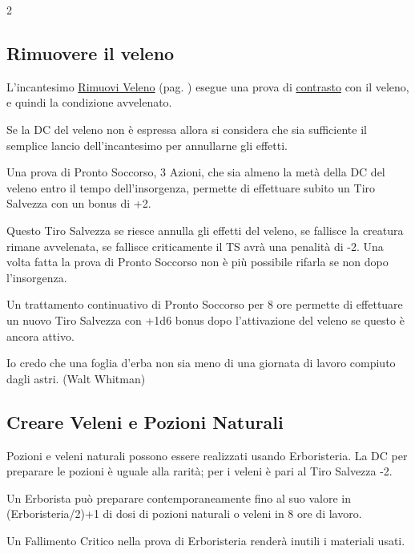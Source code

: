 \begin{multicols}{2}
\subsection{Rimuovere il veleno}

L'incantesimo \hyperlink{incrimuoviveleno}{Rimuovi Veleno} (pag. \pageref{incrimuoviveleno}) esegue una prova di \hyperlink{contrastareincantesimi}{contrasto} con il veleno, e quindi la condizione avvelenato.

Se la DC del veleno non è espressa allora si considera che sia sufficiente il semplice lancio dell'incantesimo per annullarne gli effetti.

Una prova di Pronto Soccorso, 3 Azioni, che sia almeno la metà della DC del veleno entro il tempo dell'insorgenza, permette di effettuare subito un Tiro Salvezza con un bonus di +2.

Questo Tiro Salvezza se riesce annulla gli effetti del veleno, se fallisce la creatura rimane avvelenata, se fallisce criticamente il TS avrà una penalità di -2.
Una volta fatta la prova di Pronto Soccorso non è più possibile rifarla se non dopo l'insorgenza.

Un trattamento continuativo di Pronto Soccorso per 8 ore permette di effettuare un nuovo Tiro Salvezza con +1d6 bonus dopo l'attivazione del veleno se questo è ancora attivo.

\medskip

\begin{enfasi}{
Io credo che una foglia d'erba non sia meno di una giornata di lavoro compiuto dagli astri. (Walt Whitman)}
\end{enfasi}

\subsection{Creare Veleni e Pozioni Naturali}\label{crearevelenonaturale}

Pozioni e veleni naturali possono essere realizzati usando Erboristeria. La DC per preparare le pozioni è uguale alla rarità; per i veleni è pari al Tiro Salvezza -2.

Un Erborista può preparare contemporaneamente fino al suo valore in (Erboristeria/2)+1 di dosi di pozioni naturali o veleni in 8 ore di lavoro.

Un Fallimento Critico nella prova di Erboristeria renderà inutili i materiali usati.


\end{multicols}
